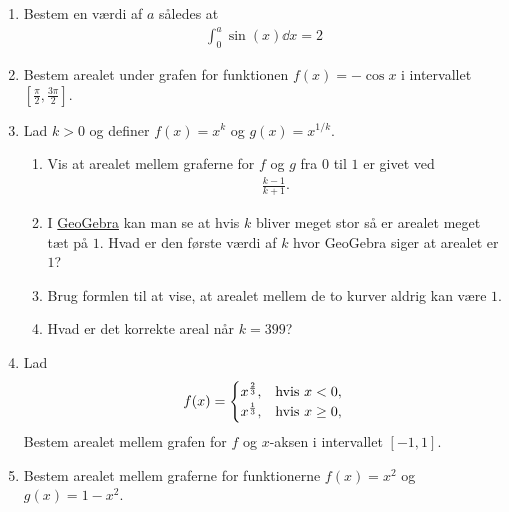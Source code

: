 \begin{enumerate}
	\item Bestem en værdi af $a$ således at 
	\begin{align*}
	\int_0^a\sin(x)\dd x=2
	\end{align*}
	
	\item Bestem arealet under grafen for funktionen $f(x)=-\cos x$ i intervallet $ [\frac{\pi}{2},\frac{3\pi}{2}] $. 
	

	
	\item Lad $k>0$ og definer $f(x)=x^k$ og $g(x)=x^{1/k}$.
	\begin{enumerate}
		\item Vis at arealet mellem graferne for $f$ og $g$ fra $0$ til $1$ er givet ved 
		\begin{align*}
		\frac{k-1}{k+1}.
		\end{align*}
		\item I \href{https://www.geogebra.org/m/csvbae28}{GeoGebra} kan man se at hvis $k$ bliver meget stor så er arealet meget tæt på $1$. Hvad er den første værdi af $k$ hvor GeoGebra siger at arealet er $1$?
		\item Brug formlen til at vise, at arealet mellem de to kurver aldrig kan være $1$.
		\item Hvad er det korrekte areal når $k=399$?
		\end{enumerate}
	
	\item Lad 
	\begin{align*}
	f(x)=\begin{cases}
	x^{\frac{2}{3}},& \textup{hvis } x<0,\\
	x^{\frac{1}{3}},& \textup{hvis } x\geq 0,
	\end{cases}
	\end{align*}
	Bestem arealet mellem grafen for $f$ og $x$-aksen i intervallet $ [-1,1] $.
	
	


	\item Bestem arealet mellem graferne for funktionerne $f(x)=x^2$ og $g(x)=1-x^2$.
	

\end{enumerate}
